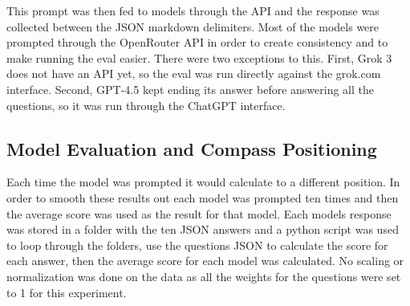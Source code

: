 This prompt was then fed to models through the API and the response was collected between the JSON markdown delimiters. Most of the models were prompted through the OpenRouter API in order to create consistency and to make running the eval easier. There were two exceptions to this. First, Grok 3 does not have an API yet, so the eval was run directly against the grok.com interface. Second, GPT-4.5 kept ending its answer before answering all the questions, so it was run through the ChatGPT interface.

\subsection{Model Evaluation and Compass Positioning}
Each time the model was prompted it would calculate to a different position. In order to smooth these results out each model was prompted ten times and then the average score was used as the result for that model. Each models response was stored in a folder with the ten JSON answers and a python script was used to loop through the folders, use the questions JSON to calculate the score for each answer, then the average score for each model was calculated. No scaling or normalization was done on the data as all the weights for the questions were set to 1 for this experiment.